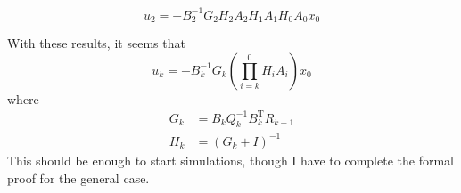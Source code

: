 \documentclass{article}
\begin{document}
\[ \boxed{ u_{2} = - B_{2}^{-1} G_{2} H_{2} A_{2} H_{1} A_{1} H_{0} A_{0} x_{0} } \]

With these results, it seems that
\[ \boxed{ u_{k} = -B_{k}^{-1} G_{k} \left( \prod_{i = k}^{0} H_{i} A_{i} \right) x_{0} } \]
where
\begin{align*}
G_{k} &= B_{k} Q_{k}^{-1} B_{k}^{\text{T}} R_{k+1} \\
H_{k} &= \left( G_{k} + I \right)^{-1}
\end{align*}
This should be enough to start simulations, though I have to complete the formal proof for the general case.
\end{document}
